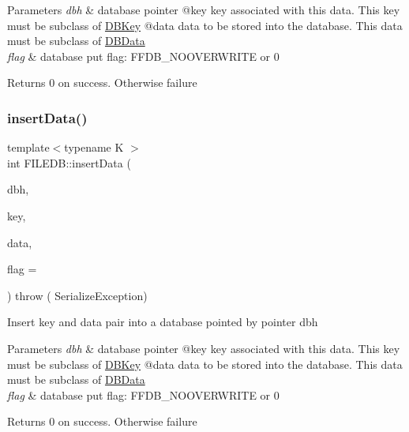 \begin{DoxyParams}{Parameters}
{\em dbh} & database pointer @key key associated with this data. This key must be subclass of \mbox{\hyperlink{classFILEDB_1_1DBKey}{D\+B\+Key}} @data data to be stored into the database. This data must be subclass of \mbox{\hyperlink{classFILEDB_1_1DBData}{D\+B\+Data}} \\
\hline
{\em flag} & database put flag\+: F\+F\+D\+B\+\_\+\+N\+O\+O\+V\+E\+R\+W\+R\+I\+TE or 0\\
\hline
\end{DoxyParams}
\begin{DoxyReturn}{Returns}
0 on success. Otherwise failure 
\end{DoxyReturn}
\mbox{\label{namespaceFILEDB_aeadc0ee930c4a7b2ddae220799008bd6}} 
\subsubsection{\texorpdfstring{insertData()}{insertData()}\hspace{0.1cm}{\footnotesize\ttfamily [2/2]}}
{\footnotesize\ttfamily template$<$typename K $>$ \\
int F\+I\+L\+E\+D\+B\+::insert\+Data (\begin{DoxyParamCaption}\item[{\mbox{\hyperlink{adat-devel_2other__libs_2filedb_2filehash_2ffdb__db_8h_a0b27b956926453a7a8141ea8e10f0df8}{F\+F\+D\+B\+\_\+\+DB}} $\ast$}]{dbh,  }\item[{const K \&}]{key,  }\item[{const std\+::string \&}]{data,  }\item[{unsigned int}]{flag = {} }\end{DoxyParamCaption}) throw ( Serialize\+Exception) }

Insert key and data pair into a database pointed by pointer dbh


\begin{DoxyParams}{Parameters}
{\em dbh} & database pointer @key key associated with this data. This key must be subclass of \mbox{\hyperlink{classFILEDB_1_1DBKey}{D\+B\+Key}} @data data to be stored into the database. This data must be subclass of \mbox{\hyperlink{classFILEDB_1_1DBData}{D\+B\+Data}} \\
\hline
{\em flag} & database put flag\+: F\+F\+D\+B\+\_\+\+N\+O\+O\+V\+E\+R\+W\+R\+I\+TE or 0\\
\hline
\end{DoxyParams}
\begin{DoxyReturn}{Returns}
0 on success. Otherwise failure 
\end{DoxyReturn}
\mbox{\label{namespaceFILEDB_a25ba56393bd11f7e104de43478a253de}} 
